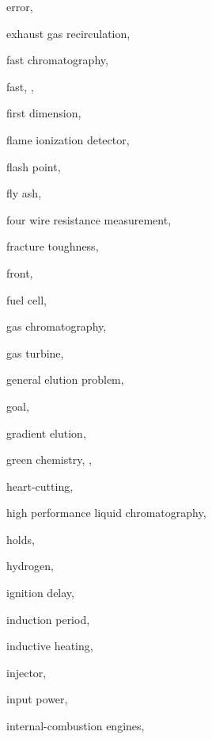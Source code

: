\begin{theindex}
  \item \lowercase {error}, 
  \item \lowercase {exhaust gas recirculation}, 
  \item \lowercase {fast chromatography}, 
  \item \lowercase {fast}, , 
  \item \lowercase {first dimension}, 
  \item \lowercase {flame ionization detector}, 
  \item \lowercase {flash point}, 
  \item \lowercase {fly ash}, 
  \item \lowercase {four wire resistance measurement}, 
  \item \lowercase {fracture toughness}, 
  \item \lowercase {front}, 
  \item \lowercase {fuel cell}, 
  \item \lowercase {gas chromatography}, 
  \item \lowercase {gas turbine}, 
  \item \lowercase {general elution problem}, 
  \item \lowercase {goal}, 
  \item \lowercase {gradient elution}, 
  \item \lowercase {green chemistry}, , 
  \item \lowercase {heart-cutting}, 
  \item \lowercase {high performance liquid chromatography}, 
  \item \lowercase {holds}, 
  \item \lowercase {hydrogen}, 
  \item \lowercase {ignition delay}, 
  \item \lowercase {induction period}, 
  \item \lowercase {inductive heating}, 
  \item \lowercase {injector}, 
  \item \lowercase {input power}, 
  \item \lowercase {internal\hyp  {}combustion engines}, 

\end{theindex}
